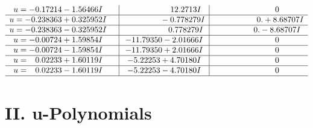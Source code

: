 \documentclass[1p]{elsarticle_modified}
\theoremstyle{definition}
\begin{document}
$$\begin{array}{c|c|c}
\begin{aligned}
u &= -0.17214 - 1.56466 I\end{aligned}
 & \phantom{-0.000000 -}12.2713 I & \phantom{-0.000000 } 0 \\ \hline\begin{aligned}
u &= -0.238363 + 0.325952 I\end{aligned}
 & \phantom{-0.000000 } -0.778279 I & \phantom{-0.000000 -}0. + 8.68707 I \\ \hline\begin{aligned}
u &= -0.238363 - 0.325952 I\end{aligned}
 & \phantom{-0.000000 -}0.778279 I & \phantom{-0.000000 } 0. - 8.68707 I \\ \hline\begin{aligned}
u &= -0.00724 + 1.59854 I\end{aligned}
 & -11.79350 - 2.01666 I & \phantom{-0.000000 } 0 \\ \hline\begin{aligned}
u &= -0.00724 - 1.59854 I\end{aligned}
 & -11.79350 + 2.01666 I & \phantom{-0.000000 } 0 \\ \hline\begin{aligned}
u &= \phantom{-}0.02233 + 1.60119 I\end{aligned}
 & -5.22253 + 4.70180 I & \phantom{-0.000000 } 0 \\ \hline\begin{aligned}
u &= \phantom{-}0.02233 - 1.60119 I\end{aligned}
 & -5.22253 - 4.70180 I & \phantom{-0.000000 } 0\\
 \hline 
 \end{array}$$\newpage
\newpage\renewcommand{\arraystretch}{1}
\centering \section*{ II. u-Polynomials}
\end{document}
